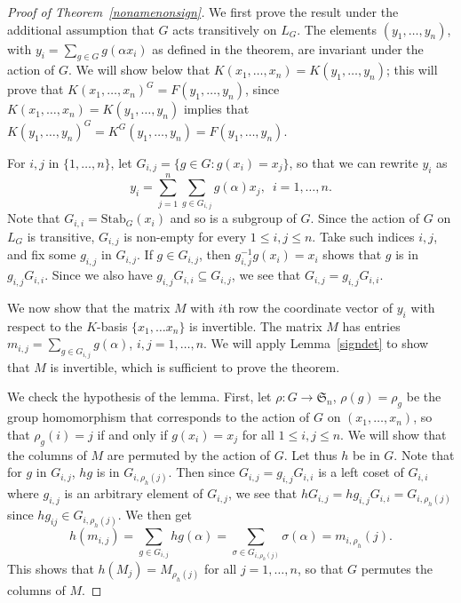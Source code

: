 \documentclass[12pt]{article}
\theoremstyle{plain}
\begin{document}
\begin{proof}[Proof of Theorem~\ref{nonamenonsign}]
  We first prove the result under the additional assumption that $G$
  acts transitively on $L_G$.  The elements $(y_1,\dots,y_n)$, with
  $y_i = \sum_{g \in G} g(\alpha x_i)$ as defined in the theorem, are
  invariant under the action of $G$. We will show below that
  $K(x_1,\dots,x_n)=K(y_1,\dots,y_n)$; this will prove that
  $K(x_1,\dots,x_n)^G=F(y_1,\dots,y_n)$, since
  $K(x_1,\dots,x_n)=K(y_1,\dots,y_n)$ implies that
  $K(y_1,\dots,y_n)^G=K^G(y_1,\dots,y_n)=F(y_1,\dots,y_n)$.

  For $i,j$ in $\{1,\dots,n\}$, let $G_{i,j}= \lbrace g \in G: g(x_i)
  = x_j \rbrace$, so that we can rewrite $y_i$ as $$y_i = \sum^n_{j
    =1}\sum_{g \in G_{i,j}}g(\alpha)x_j, \,\,\, i = 1, \ldots, n.$$
  Note that $G_{i,i}=\mathrm{Stab}_G(x_i)$ and so is a subgroup of $G$. Since the action of $G$ on $L_G$ is 
  transitive, $G_{i,j}$ is
  non-empty for every $1 \leq i,j \leq n$. Take such indices $i,j$,
  and fix some $g_{i,j}$ in $G_{i,j}$. If $g \in G_{i,j}$, then
  $g^{-1}_{i,j}g(x_i) = x_i$ shows that $g$ is in
  $g_{i,j}G_{i,i}$. Since we also have
  $g_{i,j}G_{i,i} \subseteq G_{i,j}$, we see that
  $G_{i,j} = g_{i,j}G_{i,i}$.



  We now show that the matrix $M$ with $i$th row the coordinate vector
  of $y_i$ with respect to the $K$-basis $\lbrace x_1, \ldots x_n
  \rbrace$ is invertible. The matrix $M$ has entries $m_{i,j} =
  \sum_{g \in G_{i,j}}g(\alpha)$, $i,j = 1, \ldots, n$. We will apply
  Lemma~\ref{signdet} to show that $M$ is invertible, which is sufficient to 
  prove the theorem.

  We check the hypothesis of the lemma. First, let $\rho: G \to
  \mathfrak{S}_n$, $\rho(g) = \rho_g$ be the group homomorphism that
  corresponds to the action of $G$ on $(x_1, \ldots , x_n)$, so that
  $\rho_g(i) = j$ if and only if $g(x_i) = x_j$ for all $1 \leq
  i,j\leq n$. We will show that the columns of $M$ are permuted by the
  action of $G$. Let thus $h$ be in $G$. Note that for $g$ in
  $G_{i,j}$, $hg$ is in $G_{i,\rho_h(j)}$.
  Then since $G_{i,j}=g_{i,j}G_{i,i}$ is a left coset of $G_{i,i}$ where $g_{i,j}$
is an arbitrary element of $G_{i,j}$, we see that $hG_{i,j}=hg_{i,j}G_{i,i}=G_{i,\rho_h(j)}$ 
since $hg_{ij}\in G_{i,\rho_h(j)}$.  We then get
  $$h(m_{i,j}) = \sum_{g \in G_{i,j}}hg(\alpha) = \sum_{\sigma \in
    G_{i, \rho_{h}(j)}}\sigma (\alpha) = m_{i,\rho_{h}}(j).$$ This
  shows that $h(M_j) = M_{\rho_h(j)}$ for all $j = 1, \ldots, n$, so
  that $G$ permutes the columns of $M$. 
  

\end{proof}
\end{document}

